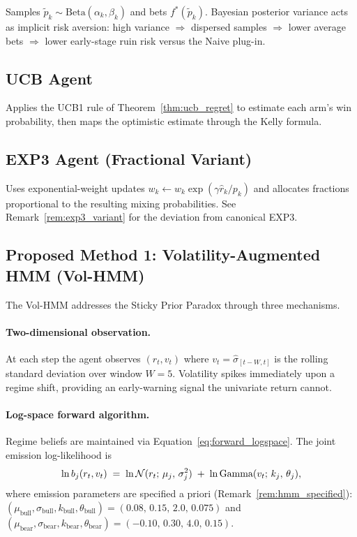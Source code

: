 Samples $\tilde p_k \sim \mathrm{Beta}(\alpha_k,\beta_k)$ and bets
$f^*(\tilde p_k)$.  Bayesian posterior variance acts as implicit risk aversion:
high variance $\Rightarrow$ dispersed samples $\Rightarrow$ lower average bets
$\Rightarrow$ lower early-stage ruin risk versus the Naive plug-in.

\subsection{UCB Agent}

Applies the UCB1 rule of Theorem~\ref{thm:ucb_regret} to estimate each arm's
win probability, then maps the optimistic estimate through the Kelly formula.

\subsection{EXP3 Agent (Fractional Variant)}

Uses exponential-weight updates $w_k \leftarrow w_k\exp(\gamma\hat r_k/p_k)$
and allocates fractions proportional to the resulting mixing probabilities.
See Remark~\ref{rem:exp3_variant} for the deviation from canonical EXP3.

\subsection{Proposed Method 1: Volatility-Augmented HMM (Vol-HMM)}
\label{sec:vol_hmm}

The Vol-HMM addresses the Sticky Prior Paradox through three mechanisms.

\paragraph{Two-dimensional observation.}
At each step the agent observes $(r_t,v_t)$ where
$v_t = \hat\sigma_{[t-W,t]}$ is the rolling standard deviation over window
$W=5$.  Volatility spikes immediately upon a regime shift, providing an
early-warning signal the univariate return cannot.

\paragraph{Log-space forward algorithm.}
Regime beliefs are maintained via Equation~\eqref{eq:forward_logspace}.  The
joint emission log-likelihood is
\begin{equation}
    \ln b_j(r_t,v_t) \;=\;
    \ln\mathcal{N}(r_t;\,\mu_j,\,\sigma_j^2)
    \;+\;
    \ln\text{Gamma}(v_t;\,k_j,\,\theta_j),
    \label{eq:vol_hmm_emission}
\end{equation}
where emission parameters are specified a priori
(Remark~\ref{rem:hmm_specified}):
$(\mu_{\text{bull}},\sigma_{\text{bull}},k_{\text{bull}},\theta_{\text{bull}})
 = (0.08,\,0.15,\,2.0,\,0.075)$ and
$(\mu_{\text{bear}},\sigma_{\text{bear}},k_{\text{bear}},\theta_{\text{bear}})
 = (-0.10,\,0.30,\,4.0,\,0.15)$.

